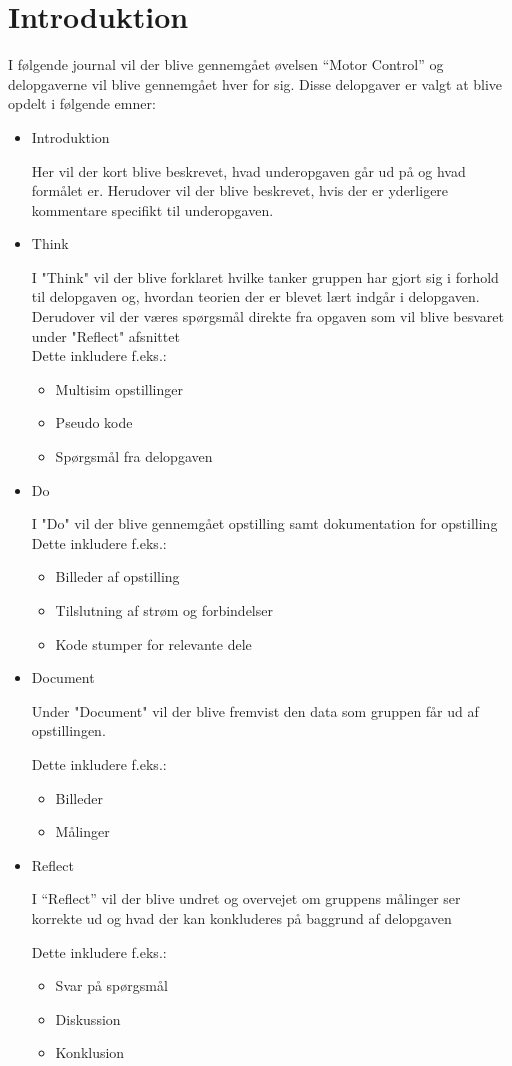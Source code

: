 \documentclass{article}
\begin{document}
\section*{Introduktion}
I følgende journal vil der blive gennemgået øvelsen ``Motor Control'' og delopgaverne vil blive gennemgået hver for sig. Disse delopgaver er valgt at blive opdelt i følgende emner:
\begin{itemize}
\item Introduktion

Her vil der kort blive beskrevet, hvad underopgaven går ud på og hvad formålet er.
Herudover vil der blive beskrevet, hvis der er yderligere kommentare specifikt til underopgaven.

\item Think

I "Think" vil der blive forklaret hvilke tanker gruppen har gjort sig i forhold til delopgaven og, hvordan teorien der er blevet lært indgår i delopgaven. Derudover vil der væres spørgsmål direkte fra opgaven som vil blive besvaret under "Reflect" afsnittet\\
Dette inkludere f.eks.:
\begin{itemize}
\item Multisim opstillinger
\item Pseudo kode
\item Spørgsmål fra delopgaven
\end{itemize}

\item Do

I "Do" vil der blive gennemgået opstilling samt dokumentation for opstilling
Dette inkludere f.eks.:

\begin{itemize}
\item Billeder af opstilling
\item Tilslutning af strøm og forbindelser
\item Kode stumper for relevante dele
\end{itemize}

\item Document

Under "Document" vil der blive fremvist den data som gruppen får ud af opstillingen.

Dette inkludere f.eks.:
\begin{itemize}
\item Billeder
\item Målinger
\end{itemize}


\item Reflect

I ``Reflect'' vil der blive undret og overvejet om gruppens målinger ser korrekte ud og hvad der kan konkluderes på baggrund af delopgaven

Dette inkludere f.eks.:
\begin{itemize}
\item Svar på spørgsmål
\item Diskussion
\item Konklusion
\end{itemize}

\end{itemize}
\end{document}
